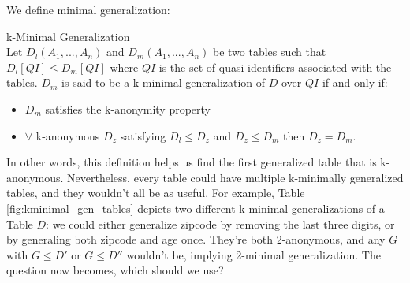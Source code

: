 We define minimal generalization:

\begin{definition}{k-Minimal Generalization} \\
Let $D_l(A_1,...,A_n)$ and $D_m(A_1,...,A_n)$ be two tables such that $D_l[QI] \leq D_m[QI]$ where $QI$ is the set of quasi-identifiers associated with the tables. $D_m$ is said to be a k-minimal generalization of $D$ over $QI$ if and only if:
\begin{itemize}
    \item $D_m$ satisfies the k-anonymity property
    \item $\forall$ k-anonymous $D_z$ satisfying $D_l \leq D_z$ and $D_z \leq D_m$ then $D_z = D_m$. 
\end{itemize}
\end{definition}

In other words, this definition helps us find the first generalized table that is k-anonymous. Nevertheless, every table could have multiple k-minimally generalized tables, and they wouldn't all be as useful. For example, Table \ref{fig:kminimal_gen_tables} depicts two different k-minimal generalizations of a Table $D$: we could either generalize zipcode by removing the last three digits, or by generaling both zipcode and age once. They're both 2-anonymous, and any $G$ with $G \leq D'$ or $G \leq D''$ wouldn't be, implying 2-minimal generalization. The question now becomes, which should we use?

